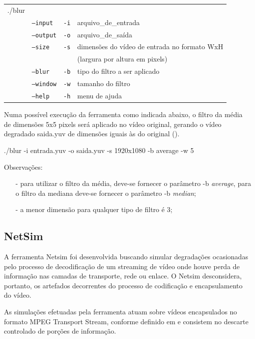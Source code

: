 \begin{table}[!h]
	\begin{tabular}{llll}
	./blur & & \\ 
	& \texttt{--input} & \texttt{-i}  & arquivo\_de\_entrada \\
	& \texttt{--output} & \texttt{-o}  & arquivo\_de\_saída \\
	& \texttt{--size} & \texttt{-s}  & dimensões do vídeo de entrada no formato WxH \\ 
	& & & (largura por altura em pixels) \\
	& \texttt{--blur} & \texttt{-b}  & tipo do filtro a ser aplicado \\
	& \texttt{--window} & \texttt{-w}  & tamanho do filtro \\
	& \texttt{--help} & \texttt{-h}  & menu de ajuda \\
	\end{tabular}
\end{table}

Numa possível execução da ferramenta como indicada abaixo, o filtro da média de dimensões 5x5 pixels será aplicado no vídeo original, gerando o vídeo degradado saida.yuv de dimensões iguais às do original ().

./blur -i entrada.yuv -o saida.yuv -s 1920x1080 -b average -w 5

Observações:
\begin{itemize}
    \item[-] para utilizar o filtro da média, deve-se fornecer o parâmetro -b \emph{average}, para o filtro da mediana deve-se fornecer o parâmetro -b \emph{median};
    \item[-] a menor dimensão para qualquer tipo de filtro é 3;
\end{itemize}

\subsection{NetSim}

A ferramenta Netsim foi desenvolvida buscando simular degradações ocasionadas pelo processo de decodificação de um streaming de vídeo onde houve perda de informação nas camadas de transporte, rede ou enlace. O Netsim desconsidera, portanto, os artefados decorrentes do processo de codificação e encapsulamento do vídeo.

As simulações efetuadas pela ferramenta atuam sobre vídeos encapsulados no formato MPEG Transport Stream, conforme definido em \cite{ituh222} e consistem no descarte controlado de porções de informação.

